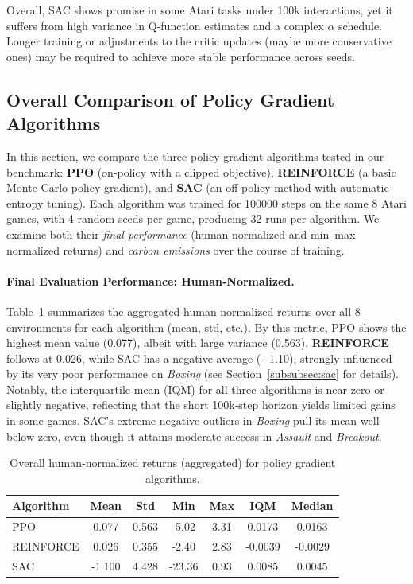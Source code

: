 Overall, SAC shows promise in some Atari tasks under 100k interactions, yet it suffers from high variance in Q-function estimates and a complex $\alpha$ schedule. Longer training or adjustments to the critic updates (maybe more conservative ones) may be required to achieve more stable performance across seeds.

\subsection{Overall Comparison of Policy Gradient Algorithms}
\label{subsec:policy_comparison}
In this section, we compare the three policy gradient algorithms tested in our benchmark: \textbf{PPO} (on-policy with a clipped objective), \textbf{REINFORCE} (a basic Monte Carlo policy gradient), and \textbf{SAC} (an off-policy method with automatic entropy tuning). Each algorithm was trained for \num{100000} steps on the same 8 Atari games, with 4 random seeds per game, producing 32 runs per algorithm. We examine both their \emph{final performance} (human‐normalized and min–max normalized returns) and \emph{carbon emissions} over the course of training.

\paragraph{Final Evaluation Performance: Human‐Normalized.}
Table~\ref{tab:policy_final_eval_human} summarizes the aggregated human‐normalized returns over all 8 environments for each algorithm (mean, std, etc.). By this metric, PPO shows the highest mean value (\num{0.077}), albeit with large variance (\num{0.563}). \textbf{REINFORCE} follows at \num{0.026}, while SAC has a negative average (\num{-1.10}), strongly influenced by its very poor performance on \emph{Boxing} (see Section~\ref{subsubsec:sac} for details). Notably, the interquartile mean (IQM) for all three algorithms is near zero or slightly negative, reflecting that the short 100k‐step horizon yields limited gains in some games. SAC's extreme negative outliers in \emph{Boxing} pull its mean well below zero, even though it attains moderate success in \emph{Assault} and \emph{Breakout}.

\begin{table} 
	\centering
	\caption{Overall human‐normalized returns (aggregated) for policy gradient algorithms.}
	\label{tab:policy_final_eval_human}
	\begin{tabular}{lcccccc}
		\toprule
		\textbf{Algorithm} & \textbf{Mean} & \textbf{Std} & \textbf{Min} & \textbf{Max} & \textbf{IQM} & \textbf{Median} \\
		\midrule
		PPO         & 0.077 & 0.563 & -5.02 & 3.31 & 0.0173 & 0.0163 \\
		REINFORCE   & 0.026 & 0.355 & -2.40 & 2.83 & -0.0039 & -0.0029 \\
		SAC         & -1.100 & 4.428 & -23.36 & 0.93 & 0.0085 & 0.0045 \\
		\bottomrule
	\end{tabular}
\end{table}

